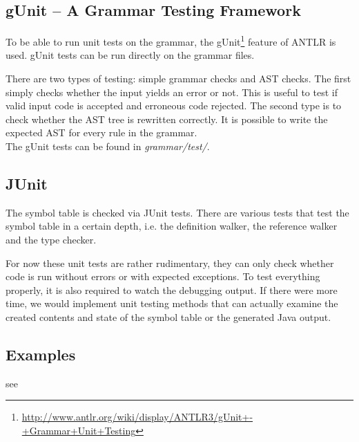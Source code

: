 \subsection{gUnit -- A Grammar Testing Framework}

To be able to run unit tests on the grammar, the gUnit\footnote{
\href{http://www.antlr.org/wiki/display/ANTLR3/gUnit+-+Grammar+Unit+Testing}
{http://www.antlr.org/wiki/display/ANTLR3/gUnit+-+Grammar+Unit+Testing}}
feature of ANTLR is used. gUnit tests can be run directly on the grammar files.

There are two types of testing: simple grammar checks and AST checks. The
first simply checks whether the input yields an error or not. This is useful
to test if valid input code is accepted and erroneous code rejected. The
second type is to check whether the AST tree is rewritten correctly. It is
possible to write the expected AST for every rule in the grammar.\\

The gUnit tests can be found in \emph{grammar/test/}.


\subsection{JUnit}

The symbol table is checked via JUnit tests. There are various tests that
test the symbol table in a certain depth, i.e. the definition walker, the
reference walker and the type checker.

For now these unit tests are rather rudimentary, they can only check whether
code is run without errors or with expected exceptions. To test everything
properly, it is also required to watch the debugging output.
If there were more time, we would implement unit testing methods that can 
actually examine the created contents and state of the symbol table or the
generated Java output.


\subsection{Examples}
see 
